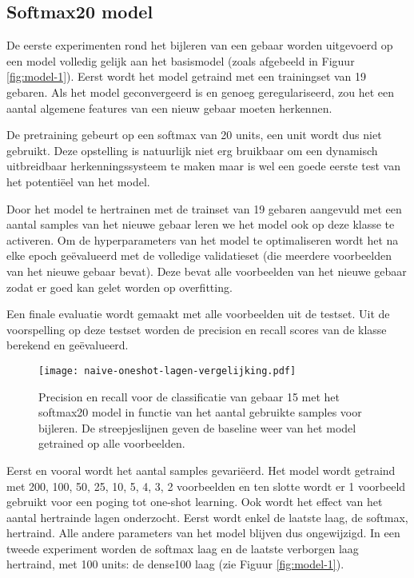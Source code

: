 \subsection{Softmax20 model}\label{sec:softmax20}

De eerste experimenten rond het bijleren van een gebaar worden uitgevoerd op een model volledig gelijk aan het basismodel (zoals afgebeeld in Figuur \ref{fig:model-1}). Eerst wordt het model getraind met een trainingset van 19 gebaren. Als het model geconvergeerd is en genoeg geregulariseerd, zou het een aantal algemene features van een nieuw gebaar moeten herkennen.

\npar De pretraining gebeurt op een softmax van 20 units, een unit wordt dus niet gebruikt. Deze opstelling is natuurlijk niet erg bruikbaar om een dynamisch uitbreidbaar herkenningssysteem te maken maar is wel een goede eerste test van het potenti\"eel van het model.

\npar Door het model te hertrainen met de trainset van 19 gebaren aangevuld met een aantal samples van het nieuwe gebaar leren we het model ook op deze klasse te activeren. Om de hyperparameters van het model te optimaliseren wordt het na elke epoch ge\"evalueerd met de volledige validatieset (die meerdere voorbeelden van het nieuwe gebaar bevat). Deze bevat alle voorbeelden van het nieuwe gebaar zodat er goed kan gelet worden op overfitting.

\npar Een finale evaluatie wordt gemaakt met alle voorbeelden uit de testset. Uit de voorspelling op deze testset worden de precision en recall scores van de klasse berekend en ge\"evalueerd.

\begin{figure}
	\centering
	\texttt{[image: naive-oneshot-lagen-vergelijking.pdf]}
	\caption{Precision en recall voor de classificatie van gebaar 15 met het softmax20 model in functie van het aantal gebruikte samples voor bijleren. De streepjeslijnen geven de baseline weer van het model getrained op alle voorbeelden.}\label{fig:naive-model}
\end{figure}

\npar Eerst en vooral wordt het aantal samples gevari\"eerd. Het model wordt getraind met 200, 100, 50, 25, 10, 5, 4, 3, 2 voorbeelden en ten slotte wordt er 1 voorbeeld gebruikt voor een poging tot one-shot learning.
\npar Ook wordt het effect van het aantal hertrainde lagen onderzocht. Eerst wordt enkel de laatste laag, de softmax, hertraind. Alle andere parameters van het model blijven dus ongewijzigd. In een tweede experiment worden de softmax laag en de laatste verborgen laag hertraind, met 100 units: de dense100 laag (zie Figuur \ref{fig:model-1}).

